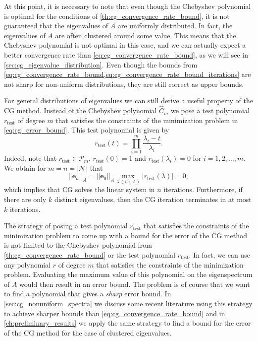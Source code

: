 At this point, it is necessary to note that even though the Chebyshev polynomial is optimal for the conditions of \cref{th:cg_convergence_rate_bound}, it is not guaranteed that the eigenvalues of $A$ are uniformly distributed. In fact, the eigenvalues of $A$ are often clustered around some value. This means that the Chebyshev polynomial is not optimal in this case, and we can actually expect a better convergence rate than \cref{eq:cg_convergence_rate_bound}, as we will see in \cref{sec:cg_eigenvalue_distribution}. Even though the bounds from \cref{eq:cg_convergence_rate_bound,eq:cg_convergence_rate_bound_iterations} are not sharp for non-uniform distributions, they are still correct as upper bounds.

For general distributions of eigenvalues we can still derive a useful property of the CG method. Instead of the Chebyshev polynomial $\hat{C}_m$ we pose a test polynomial $r_{\textrm{test}}$ of degree $m$ that satisfies the constraints of the minimization problem in \cref{eq:cg_error_bound}. This test polynomial is given by
\[
  r_{\textrm{test}}(t) = \prod_{i=1}^m \frac{\lambda_i - t}{\lambda_i}.
\]
Indeed, note that $r_{\textrm{test}}\in\mathcal{P}_m$, $r_{\textrm{test}}(0) = 1$ and $r_{\textrm{test}}(\lambda_i) = 0$ for $i = 1, 2, \dots, m$. We obtain for $m = n = |\mathcal{N}|$ that
\[
  ||\mathbf{e}_n||_A = ||\mathbf{e}_0||_A \max_{\lambda \in \sigma(A)} |r_{\textrm{test}}(\lambda)| = 0,
\]
which implies that CG solves the linear system in $n$ iterations. Furthermore, if there are only $k$ distinct eigenvalues, then the CG iteration terminates in at most $k$ iterations.

The strategy of posing a test polynomial $r_{\textrm{test}}$ that satisfies the constraints of the minimization problem to come up with a bound for the error of the CG method is not limited to the Chebyshev polynomial from \cref{th:cg_convergence_rate_bound} or the test polynomial $r_{\textrm{test}}$. In fact, we can use any polynomial $r$ of degree $m$ that satisfies the constraints of the minimization problem. Evaluating the maximum value of this polynomial on the eigenspectrum of $A$ would then result in an error bound. The problem is of course that we want to find a polynomial that gives a \textit{sharp} error bound. In \cref{sec:cg_nonuniform_spectra} we discuss some recent literature using this strategy to achieve sharper bounds than \cref{eq:cg_convergence_rate_bound} and in \cref{ch:preliminary_results} we apply the same strategy to find a bound for the error of the CG method for the case of clustered eigenvalues.

